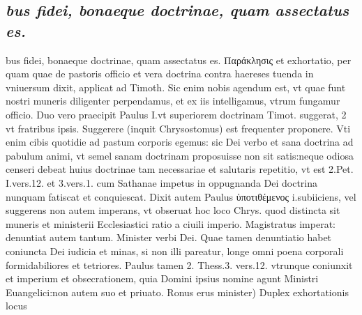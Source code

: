 \documentclass{article}
\begin{document}
\begin{pages}
\subsection*{\textit{bus fidei, bonaeque doctrinae, quam assectatus es.}}bus fidei, bonaeque doctrinae, quam assectatus es. Παράκλησις et exhortatio, per quam quae de pastoris officio et vera doctrina contra haereses tuenda in vniuersum dixit, applicat ad Timoth. Sic enim nobis agendum est, vt quae funt nostri muneris diligenter perpendamus, et ex iis intelligamus, vtrum fungamur officio. Duo vero praecipit Paulus I.vt superiorem doctrinam Timot. suggerat, 2 vt fratribus ipsis. Suggerere (inquit Chrysostomus) est frequenter proponere. Vti enim cibis quotidie ad pastum corporis egemus: sic Dei verbo et sana doctrina ad pabulum animi, vt semel sanam doctrinam proposuisse non sit satis:neque odiosa censeri debeat huius doctrinae tam necessariae et salutaris repetitio, vt est 2.Pet. I.vers.12. et 3.vers.1. cum Sathanae impetus in oppugnanda Dei doctrina nunquam fatiscat et conquiescat. Dixit autem Paulus ὐποτιθέμενος i.subiiciens, vel suggerens non autem imperans, vt obseruat hoc loco Chrys. quod distincta sit muneris et ministerii Ecclesiastici ratio a ciuili imperio. Magistratus imperat: denuntiat autem tantum. Minister verbi Dei. Quae tamen denuntiatio habet coniuncta Dei iudicia et minas, si non illi pareatur, longe omni poena corporali formidabiliores et tetriores. Paulus tamen 2. Thess.3. vers.12. vtrunque coniunxit et imperium et obsecrationem, quia Domini ipsius nomine agunt Ministri Euangelici:non autem suo et priuato. Ronus erus minister) Duplex exhortationis locus  \pend

\end{pages}
\end{document}
